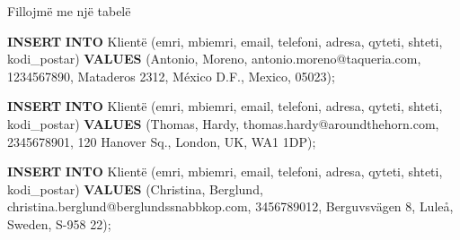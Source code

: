 \documentclass[
  ignorenonframetext,
]{beamer}
\newenvironment{Shaded}{\begin{snugshade}}{\end{snugshade}}
\newcommand{\KeywordTok}[1]{\textcolor[rgb]{0.13,0.29,0.53}{\textbf{#1}}}
\newcommand{\NormalTok}[1]{#1}
\newcommand{\StringTok}[1]{\textcolor[rgb]{0.31,0.60,0.02}{#1}}
\begin{document}
\begin{frame}[fragile]{Fillojmë me një tabelë}
\begin{Shaded}
\begin{Highlighting}[]
\KeywordTok{INSERT} \KeywordTok{INTO}\NormalTok{ Klientë (emri, mbiemri, email, telefoni, adresa, qyteti, shteti, kodi\_postar)}
\KeywordTok{VALUES}\NormalTok{ (}\StringTok{\textquotesingle{}Antonio\textquotesingle{}}\NormalTok{, }\StringTok{\textquotesingle{}Moreno\textquotesingle{}}\NormalTok{, }\StringTok{\textquotesingle{}antonio.moreno@taqueria.com\textquotesingle{}}\NormalTok{, }\StringTok{\textquotesingle{}1234567890\textquotesingle{}}\NormalTok{, }\StringTok{\textquotesingle{}Mataderos 2312\textquotesingle{}}\NormalTok{, }\StringTok{\textquotesingle{}México D.F.\textquotesingle{}}\NormalTok{, }\StringTok{\textquotesingle{}Mexico\textquotesingle{}}\NormalTok{, }\StringTok{\textquotesingle{}05023\textquotesingle{}}\NormalTok{);}

\KeywordTok{INSERT} \KeywordTok{INTO}\NormalTok{ Klientë (emri, mbiemri, email, telefoni, adresa, qyteti, shteti, kodi\_postar)}
\KeywordTok{VALUES}\NormalTok{ (}\StringTok{\textquotesingle{}Thomas\textquotesingle{}}\NormalTok{, }\StringTok{\textquotesingle{}Hardy\textquotesingle{}}\NormalTok{, }\StringTok{\textquotesingle{}thomas.hardy@aroundthehorn.com\textquotesingle{}}\NormalTok{, }\StringTok{\textquotesingle{}2345678901\textquotesingle{}}\NormalTok{, }\StringTok{\textquotesingle{}120 Hanover Sq.\textquotesingle{}}\NormalTok{, }\StringTok{\textquotesingle{}London\textquotesingle{}}\NormalTok{, }\StringTok{\textquotesingle{}UK\textquotesingle{}}\NormalTok{, }\StringTok{\textquotesingle{}WA1 1DP\textquotesingle{}}\NormalTok{);}

\KeywordTok{INSERT} \KeywordTok{INTO}\NormalTok{ Klientë (emri, mbiemri, email, telefoni, adresa, qyteti, shteti, kodi\_postar)}
\KeywordTok{VALUES}\NormalTok{ (}\StringTok{\textquotesingle{}Christina\textquotesingle{}}\NormalTok{, }\StringTok{\textquotesingle{}Berglund\textquotesingle{}}\NormalTok{, }\StringTok{\textquotesingle{}christina.berglund@berglundssnabbkop.com\textquotesingle{}}\NormalTok{, }\StringTok{\textquotesingle{}3456789012\textquotesingle{}}\NormalTok{, }\StringTok{\textquotesingle{}Berguvsvägen 8\textquotesingle{}}\NormalTok{, }\StringTok{\textquotesingle{}Luleå\textquotesingle{}}\NormalTok{, }\StringTok{\textquotesingle{}Sweden\textquotesingle{}}\NormalTok{, }\StringTok{\textquotesingle{}S{-}958 22\textquotesingle{}}\NormalTok{);}


\end{Highlighting}
\end{Shaded}
\end{frame}
\end{document}
